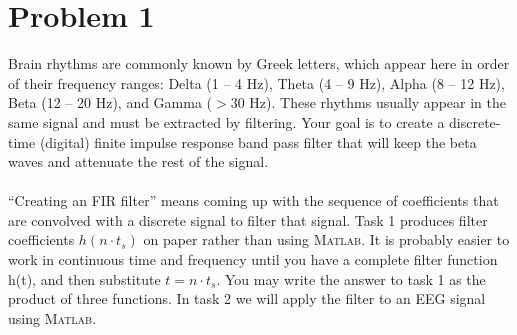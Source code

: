 \documentclass[12pt, a4paper]{article}
\begin{document}
\vspace*{-3mm}
\section*{Problem 1} 
Brain rhythms are commonly known by Greek letters, which appear here in order of
their frequency ranges: Delta (1 – 4 Hz), Theta (4 – 9 Hz), Alpha (8 – 12 Hz), Beta
(12 – 20 Hz), and Gamma ($>$30 Hz). These rhythms usually appear in the same
signal and must be extracted by filtering. Your goal is to create a discrete-time
(digital) finite impulse response band pass filter that will keep the beta waves and
attenuate the rest of the signal. \\ \\
``Creating an FIR filter'' means coming up with the sequence of coefficients that are
convolved with a discrete signal to filter that signal. Task 1 produces filter
coefficients $h(n\cdot t_s)$ on paper rather than using \textsc{Matlab}. It is probably easier to
work in continuous time and frequency until you have a complete filter function
h(t), and then substitute $t = n \cdot t_s$. You may write the answer to task 1 as the product
of three functions. In task 2 we will apply the filter to an EEG signal using \textsc{Matlab}.
\end{document}
